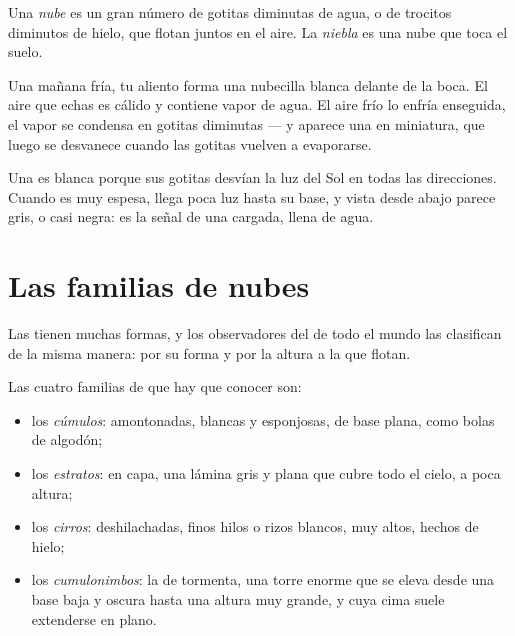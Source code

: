 \begin{definition}\label{def:g4:clouds-rain-snow:cloud}
Una \emph{nube} es un gran número de gotitas diminutas de agua,
o de trocitos diminutos de hielo, que flotan juntos en el aire. La
\emph{niebla} es una nube que toca el suelo.
\end{definition}

\begin{example}\label{ex:g4:clouds-rain-snow:breath}
Una mañana fría, tu aliento forma una nubecilla blanca delante de la boca.
El aire que echas es cálido y contiene vapor de agua. El aire frío lo
enfría enseguida, el vapor se condensa en gotitas diminutas --- y aparece
una  en miniatura, que luego se desvanece cuando las gotitas vuelven a
evaporarse.
\end{example}

Una  es blanca porque sus gotitas desvían la luz del Sol en todas las
direcciones. Cuando es muy espesa, llega poca luz hasta su base, y vista
desde abajo parece gris, o casi negra: es la señal de una  cargada,
llena de agua.

\section{Las familias de nubes}

Las  tienen muchas formas, y los observadores del  de todo el
mundo las clasifican de la misma manera: por su forma y por la altura a la
que flotan.

\begin{definition}\label{def:g4:clouds-rain-snow:cloud-families}
Las cuatro familias de  que hay que conocer son:
\begin{itemize}
  \item los \emph{cúmulos}:  amontonadas,
        blancas y esponjosas, de base plana, como bolas de algodón;
  \item los \emph{estratos}:  en capa, una lámina gris
        y plana que cubre todo el cielo, a poca altura;
  \item los \emph{cirros}:  deshilachadas, finos hilos o
        rizos blancos, muy altos, hechos de hielo;
  \item los \emph{cumulonimbos}: la  de tormenta,
        una torre enorme que se eleva desde una base baja y oscura hasta
        una altura muy grande, y cuya cima suele extenderse en plano.
\end{itemize}
\end{definition}

